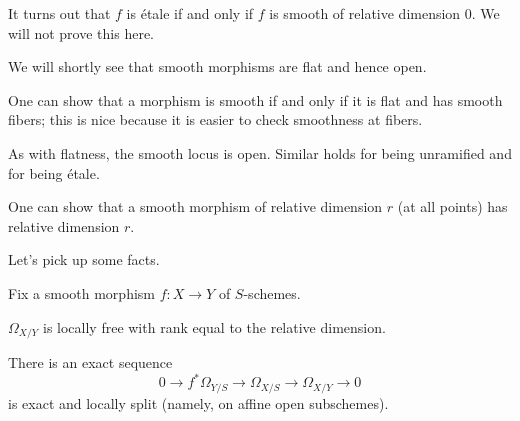 \documentclass[../notes.tex]{subfiles}
\begin{document}
\begin{remark}
	It turns out that $f$ is \'etale if and only if $f$ is smooth of relative dimension $0$. We will not prove this here.
\end{remark}
\begin{remark}
	We will shortly see that smooth morphisms are flat and hence open.
\end{remark}
\begin{remark}
	One can show that a morphism is smooth if and only if it is flat and has smooth fibers; this is nice because it is easier to check smoothness at fibers.
\end{remark}
\begin{remark}
	As with flatness, the smooth locus is open. Similar holds for being unramified and for being \'etale.
\end{remark}
\begin{remark}
	One can show that a smooth morphism of relative dimension $r$ (at all points) has relative dimension $r$.
\end{remark}
Let's pick up some facts.
\begin{proposition}
	Fix a smooth morphism $f\colon X\to Y$ of $S$-schemes.
	\begin{listalph}
		\item $\Omega_{X/Y}$ is locally free with rank equal to the relative dimension.
		\item There is an exact sequence
		\[0\to f^*\Omega_{Y/S}\to\Omega_{X/S}\to\Omega_{X/Y}\to0\]
		is exact and locally split (namely, on affine open subschemes).
	\end{listalph}
\end{proposition}
\end{document}

